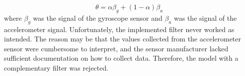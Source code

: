 \begin{displaymath}
\theta = \alpha \beta_{g} + (1-\alpha)\beta_{a}
\end{displaymath}
where $\beta_g$ was the signal of the gyroscope sensor and $\beta_a$ was the signal of the accelerometer signal. Unfortunately, the implemented filter never worked as intended. The reason may be that the values collected from the accelerometer sensor were cumbersome to interpret, and the sensor manufacturer lacked sufficient documentation on how to collect data. Therefore, the model with a complementary filter was rejected.

\newpage


\theendnotes
